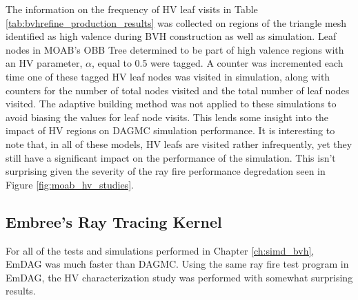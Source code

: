 The information on the frequency of HV leaf visits in Table
\ref{tab:bvhrefine_production_results} was collected on regions of the triangle
mesh identified as high valence during BVH construction as well as
simulation. Leaf nodes in MOAB's OBB Tree determined to be part of high valence
regions with an HV parameter, $\alpha$, equal to 0.5 were tagged. A counter was
incremented each time one of these tagged HV leaf nodes was visited in
simulation, along with counters for the number of total nodes visited and the
total number of leaf nodes visited. The adaptive building method was not applied
to these simulations to avoid biasing the values for leaf node visits. This
lends some insight into the impact of HV regions on DAGMC simulation
performance. It is interesting to note that, in all of these models, HV leafs are
visited rather infrequently, yet they still have a significant impact on the
performance of the simulation. This isn't surprising given the severity of the
ray fire performance degredation seen in Figure \ref{fig:moab_hv_studies}.

\subsection{Embree's Ray Tracing Kernel}\label{sec:emdag_hv_study}

For all of the tests and simulations performed in Chapter \ref{ch:simd_bvh},
EmDAG was much faster than DAGMC. Using the same ray fire test program in EmDAG,
the HV characterization study was performed with somewhat surprising results. 


